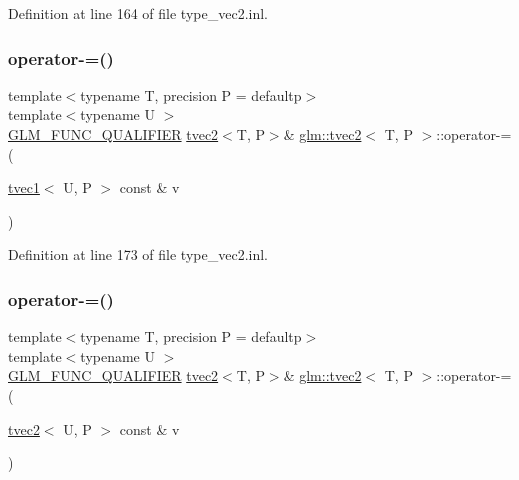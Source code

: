 Definition at line 164 of file type\+\_\+vec2.\+inl.

\mbox{\label{structglm_1_1tvec2_a9a7beb6222ef80a7f3cf2e9931182445}} 
\subsubsection{\texorpdfstring{operator-\/=()}{operator-=()}\hspace{0.1cm}{\footnotesize\ttfamily [5/6]}}
{\footnotesize\ttfamily template$<$typename T, precision P = defaultp$>$ \\
template$<$typename U $>$ \\
\mbox{\hyperlink{setup_8hpp_a33fdea6f91c5f834105f7415e2a64407}{G\+L\+M\+\_\+\+F\+U\+N\+C\+\_\+\+Q\+U\+A\+L\+I\+F\+I\+ER}} \mbox{\hyperlink{structglm_1_1tvec2}{tvec2}}$<$T, P$>$\& \mbox{\hyperlink{structglm_1_1tvec2}{glm\+::tvec2}}$<$ T, P $>$\+::operator-\/= (\begin{DoxyParamCaption}\item[{\mbox{\hyperlink{structglm_1_1tvec1}{tvec1}}$<$ U, P $>$ const \&}]{v }\end{DoxyParamCaption})}



Definition at line 173 of file type\+\_\+vec2.\+inl.

\mbox{\label{structglm_1_1tvec2_a77a58d01579458e0a09dcbd7a174592c}} 
\subsubsection{\texorpdfstring{operator-\/=()}{operator-=()}\hspace{0.1cm}{\footnotesize\ttfamily [6/6]}}
{\footnotesize\ttfamily template$<$typename T, precision P = defaultp$>$ \\
template$<$typename U $>$ \\
\mbox{\hyperlink{setup_8hpp_a33fdea6f91c5f834105f7415e2a64407}{G\+L\+M\+\_\+\+F\+U\+N\+C\+\_\+\+Q\+U\+A\+L\+I\+F\+I\+ER}} \mbox{\hyperlink{structglm_1_1tvec2}{tvec2}}$<$T, P$>$\& \mbox{\hyperlink{structglm_1_1tvec2}{glm\+::tvec2}}$<$ T, P $>$\+::operator-\/= (\begin{DoxyParamCaption}\item[{\mbox{\hyperlink{structglm_1_1tvec2}{tvec2}}$<$ U, P $>$ const \&}]{v }\end{DoxyParamCaption})}



